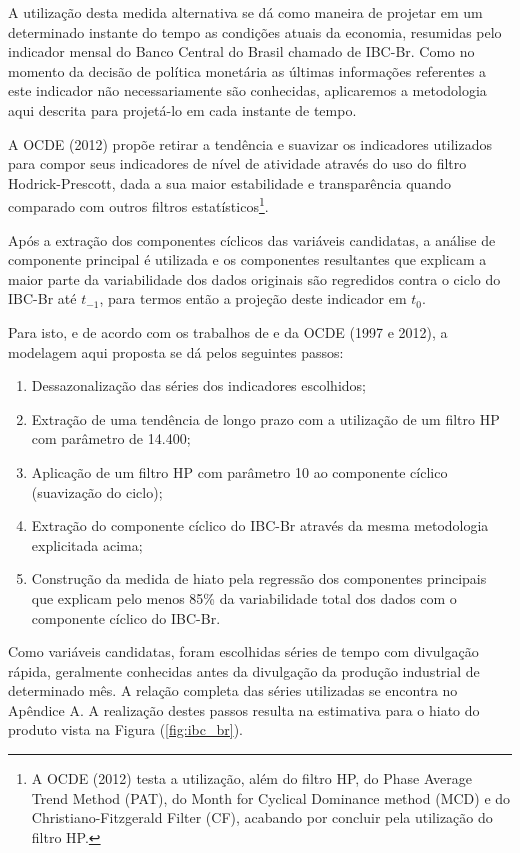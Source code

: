 \documentclass[
	article,			%
	11pt,				%
	oneside,			%
	a4paper,			%
	english,			%
	brazil,				%
	]{abntex2}
\begin{document}
	A utilização desta medida alternativa se dá como maneira de projetar em um determinado instante do tempo as condições atuais da economia, resumidas pelo indicador mensal do Banco Central do Brasil chamado de IBC-Br. Como no momento da decisão de política monetária as últimas informações referentes a este indicador não necessariamente são conhecidas, aplicaremos a metodologia aqui descrita para projetá-lo em cada instante de tempo.
	
	A OCDE (2012) propõe retirar a tendência e suavizar os indicadores utilizados para compor seus indicadores de nível de atividade através do uso do filtro Hodrick-Prescott, dada a sua maior estabilidade e transparência quando comparado com outros filtros estatísticos\footnote{A OCDE (2012) testa a utilização, além do filtro HP, do Phase Average Trend Method (PAT), do Month for Cyclical Dominance method (MCD) e do Christiano-Fitzgerald Filter (CF), acabando por concluir pela utilização do filtro HP.}.
	
	Após a extração dos componentes cíclicos das variáveis candidatas, a análise de componente principal é utilizada e os componentes resultantes que explicam a maior parte da variabilidade dos dados originais são regredidos contra o ciclo do IBC-Br até $t_{-1}$, para termos então a projeção deste indicador em $t_0$.
	
	Para isto, e de acordo com os trabalhos de  e da OCDE (1997 e 2012), a modelagem aqui proposta se dá pelos seguintes passos:
	
	\begin{enumerate}
		\item Dessazonalização das séries dos indicadores escolhidos;
		\item Extração de uma tendência de longo prazo com a utilização de um filtro HP com parâmetro de 14.400;
		\item Aplicação de um filtro HP com parâmetro 10 ao componente cíclico (suavização do ciclo);
		\item Extração do componente cíclico do IBC-Br através da mesma metodologia explicitada acima;
		\item Construção da medida de hiato pela regressão dos componentes principais que explicam pelo menos 85\% da variabilidade total dos dados com o componente cíclico do IBC-Br.
	\end{enumerate}
	
	Como variáveis candidatas, foram escolhidas séries de tempo com divulgação rápida, geralmente conhecidas antes da divulgação da produção industrial de determinado mês. A relação completa das séries utilizadas se encontra no Apêndice A. A realização destes passos resulta na estimativa para o hiato do produto vista na Figura (\ref{fig:ibc_br}).
	
\end{document}
